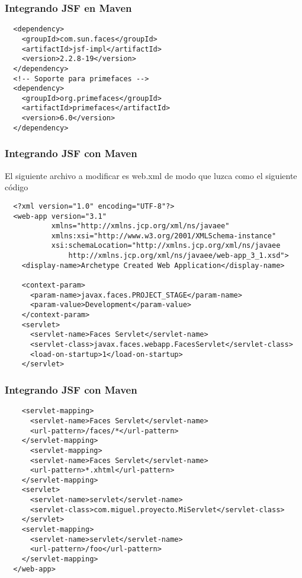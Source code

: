 \documentclass{beamer}
\begin{document}
\begin{frame}[fragile]
  \frametitle{Integrando JSF en Maven}
  \begin{verbatim}
  <dependency>
    <groupId>com.sun.faces</groupId>
    <artifactId>jsf-impl</artifactId>
    <version>2.2.8-19</version>
  </dependency>
  <!-- Soporte para primefaces -->
  <dependency>
    <groupId>org.primefaces</groupId>
    <artifactId>primefaces</artifactId>
    <version>6.0</version>
  </dependency>
  \end{verbatim}
\end{frame}

\begin{frame}[fragile]
  \frametitle{Integrando JSF con Maven}
  El siguiente archivo a modificar es web.xml de modo que luzca como
  el siguiente código

  \begin{verbatim}
  <?xml version="1.0" encoding="UTF-8"?>
  <web-app version="3.1"
           xmlns="http://xmlns.jcp.org/xml/ns/javaee"
           xmlns:xsi="http://www.w3.org/2001/XMLSchema-instance"
           xsi:schemaLocation="http://xmlns.jcp.org/xml/ns/javaee
               http://xmlns.jcp.org/xml/ns/javaee/web-app_3_1.xsd">
    <display-name>Archetype Created Web Application</display-name>

    <context-param>
      <param-name>javax.faces.PROJECT_STAGE</param-name>
      <param-value>Development</param-value>
    </context-param>
    <servlet>
      <servlet-name>Faces Servlet</servlet-name>
      <servlet-class>javax.faces.webapp.FacesServlet</servlet-class>
      <load-on-startup>1</load-on-startup>
    </servlet>
  \end{verbatim}
\end{frame}

\begin{frame}[fragile]
  \frametitle{Integrando JSF con Maven}
  \begin{verbatim}
    <servlet-mapping>
      <servlet-name>Faces Servlet</servlet-name>
      <url-pattern>/faces/*</url-pattern>
    </servlet-mapping>
      <servlet-mapping>
      <servlet-name>Faces Servlet</servlet-name>
      <url-pattern>*.xhtml</url-pattern>
    </servlet-mapping>
    <servlet>
      <servlet-name>servlet</servlet-name>
      <servlet-class>com.miguel.proyecto.MiServlet</servlet-class>
    </servlet>
    <servlet-mapping>
      <servlet-name>servlet</servlet-name>
      <url-pattern>/foo</url-pattern>
    </servlet-mapping>
  </web-app>
  \end{verbatim}
\end{frame}
\end{document}

